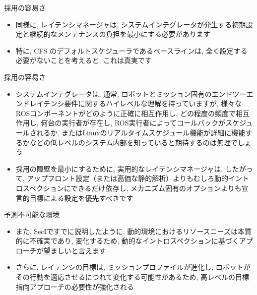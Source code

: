 \begin{frame}{採用の容易さ}
    \begin{itemize}
        \item 同様に, レイテンシマネージャは, システムインテグレータが発生する初期設定と継続的なメンテナンスの負担を最小にする必要があります
        \item 特に, CFS のデフォルトスケジューラであるベースラインは, 全く設定する必要がないことを考えると, これは真実です
    \end{itemize}
\end{frame}

\begin{frame}{採用の容易さ}
    \begin{itemize}
        \item システムインテグレータは, 通常, ロボットとミッション固有のエンドツーエンドレイテンシ要件に関するハイレベルな理解を持っていますが, 様々なROSコンポーネントがどのように正確に相互作用し, どの程度の頻度で相互作用し, 何台の実行者が存在し, ROS実行者によってコールバックがスケジュールされるか, またはLinuxのリアルタイムスケジュール機能が詳細に機能するかなどの低レベルのシステム内部を知っていると期待するのは無理でしょう
        \item 採用の障壁を最小にするために, 実用的なレイテンシマネージャは, したがって, アップフロント設定（または高価な静的解析）よりもむしろ動的イントロスペクションにできるだけ依存し, メカニズム固有のオプションよりも宣言的目標による設定を優先すべきです
    \end{itemize}
\end{frame}

\begin{frame}{予測不可能な環境}
    \begin{itemize}
        \item また, SecIですでに説明したように, 動的環境におけるリソースニーズは本質的に不確実であり, 変化するため, 動的なイントロスペクションに基づくアプローチが望ましいと言えます
        \item さらに, レイテンシの目標は, ミッションプロファイルが進化し, ロボットがその行動を適応させるにつれて変化する可能性があるため, 高レベルの目標指向アプローチの必要性が強化される
    \end{itemize}
\end{frame}

